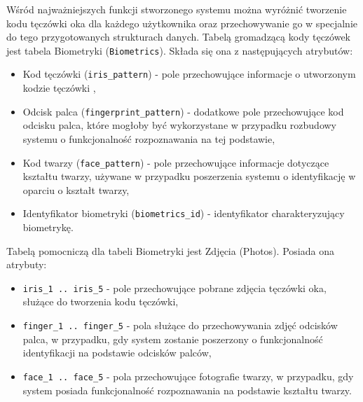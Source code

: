 Wśród najważniejszych funkcji stworzonego systemu można wyróżnić tworzenie kodu tęczówki oka dla każdego użytkownika oraz przechowywanie go w specjalnie do tego przygotowanych strukturach danych. Tabelą gromadzącą kody tęczówek jest tabela Biometryki (\verb!Biometrics!). Składa się ona z następujących atrybutów:
\begin{itemize}
\item Kod tęczówki (\verb!iris_pattern!) - pole przechowujące informacje o utworzonym kodzie tęczówki ,
\item Odcisk palca (\verb!fingerprint_pattern!) - dodatkowe pole przechowujące kod odcisku palca, które mogłoby być wykorzystane w przypadku rozbudowy systemu o funkcjonalność rozpoznawania na tej podstawie,
\item Kod twarzy (\verb!face_pattern!) - pole przechowujące informacje dotyczące kształtu twarzy, używane w przypadku poszerzenia systemu o identyfikację w oparciu o kształt twarzy,
\item Identyfikator biometryki (\verb!biometrics_id!) - identyfikator charakteryzujący biometrykę.
\end{itemize}

Tabelą pomocniczą dla tabeli Biometryki jest Zdjęcia (Photos). Posiada ona atrybuty:
\begin{itemize}
\item \verb!iris_1 .. iris_5! - pole przechowujące pobrane zdjęcia tęczówki oka, służące do tworzenia kodu tęczówki,
\item \verb!finger_1 .. finger_5! - pola służące do przechowywania zdjęć odcisków palca, w przypadku, gdy system zostanie poszerzony o funkcjonalność identyfikacji na podstawie odcisków palców,
\item \verb!face_1 .. face_5! - pola przechowujące fotografie twarzy, w przypadku, gdy system posiada funkcjonalność rozpoznawania na podstawie kształtu twarzy.
\end{itemize}


